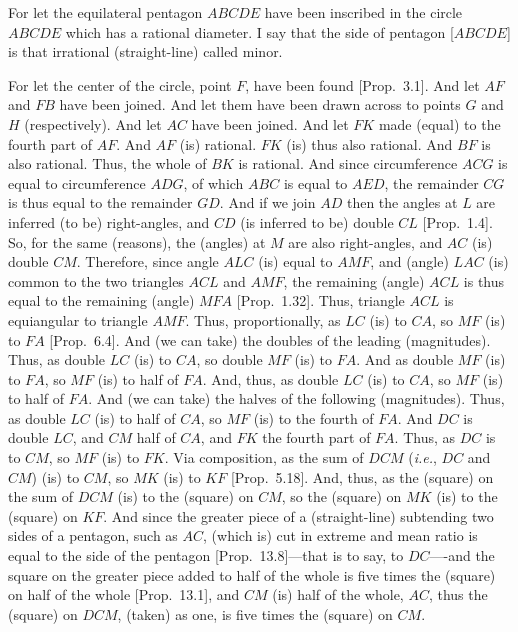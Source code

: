 \begin{Parallel}{}{}
{For let the equilateral pentagon $ABCDE$ have been inscribed  in the circle $ABCDE$ which has a rational diameter. I say that the side of pentagon
[$ABCDE$] is that irrational (straight-line) called minor.

For let the center of the circle, point $F$, have been found [Prop.~3.1].
And let $AF$ and $FB$ have been joined. And let them have been drawn
across to points $G$ and $H$ (respectively). And let $AC$ have been joined.
And let $FK$ made (equal) to the fourth part of $AF$. And $AF$ (is) rational. $FK$ (is) thus also rational. And $BF$ is also rational. Thus,
the whole of $BK$ is rational. And since circumference $ACG$ is equal
to circumference $ADG$, of which $ABC$ is equal to $AED$, the
remainder $CG$ is thus equal to the remainder $GD$.
And if we join $AD$ then the angles at $L$ are inferred (to be) right-angles, 
and $CD$ (is inferred to be) double $CL$ [Prop.~1.4].  So, for the same (reasons), 
the (angles) at $M$ are also right-angles, and $AC$ (is) double $CM$. Therefore,
since angle $ALC$ (is) equal to $AMF$, and (angle) $LAC$ (is) common
to the two triangles $ACL$ and $AMF$, the remaining (angle) $ACL$ is thus
equal to the remaining (angle) $MFA$ [Prop.~1.32]. Thus, triangle 
$ACL$  is equiangular to triangle $AMF$. Thus, proportionally, 
as $LC$ (is) to $CA$, so $MF$ (is) to $FA$ [Prop.~6.4]. And (we can take) the
doubles of the leading (magnitudes). Thus, as double $LC$ (is) to $CA$,
so double $MF$ (is) to $FA$. And as double $MF$ (is) to $FA$, so
$MF$ (is) to half of $FA$. And, thus, as double $LC$ (is) to $CA$,
so $MF$ (is) to half of $FA$. And (we can take) the halves of the following
(magnitudes). Thus, as double $LC$ (is) to half of $CA$, so $MF$
(is) to the fourth of $FA$. And $DC$ is double $LC$, and  $CM$ half
of $CA$, and $FK$ the fourth part of $FA$.  Thus, as $DC$
is to $CM$, so $MF$ (is) to $FK$. Via composition, as the
sum of $DCM$ ({\em i.e.}, $DC$ and $CM$)
(is) to $CM$, so $MK$ (is) to $KF$ [Prop.~5.18]. And, thus, as the (square) on the
sum of $DCM$ (is) to the (square) on $CM$, so the (square) on $MK$
(is) to the (square) on $KF$. And since the
greater piece of a (straight-line) subtending two sides of a
pentagon, such as $AC$, (which is) cut in extreme and mean ratio is equal to the side of the pentagon [Prop.~13.8]---that is to say,
to $DC$----and the square on the greater piece added to half of the
whole is five times the (square) on half of the whole [Prop.~13.1], 
and $CM$ (is) half of the whole, $AC$, thus the (square) on
$DCM$, (taken) as one, is five times the (square) on $CM$.
}
\end{Parallel}
